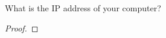 \documentclass[../../main.tex]{subfiles}
\begin{document}
\begin{wts}
What is the IP address of your computer?
\end{wts}
\begin{proof}

\end{proof}
\end{document}
